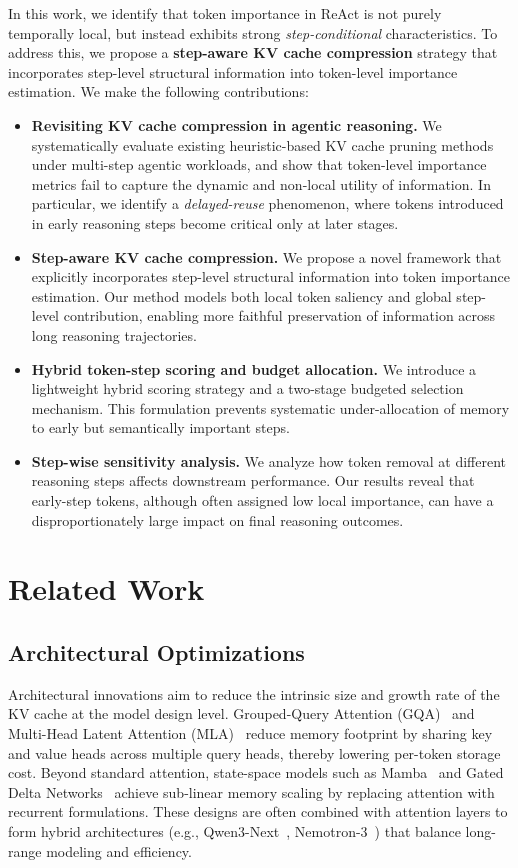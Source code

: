 \documentclass[11pt]{article}
\begin{document}
In this work, we identify that token importance in ReAct is not purely temporally local, but instead exhibits strong \emph{step-conditional} characteristics. To address this, we propose a \textbf{step-aware KV cache compression} strategy that incorporates step-level structural information into token-level importance estimation. We make the following contributions:
\begin{itemize}
    \item \textbf{Revisiting KV cache compression in agentic reasoning.} We systematically evaluate existing heuristic-based KV cache pruning methods under multi-step agentic workloads, and show that token-level importance metrics fail to capture the dynamic and non-local utility of information. In particular, we identify a \emph{delayed-reuse} phenomenon, where tokens introduced in early reasoning steps become critical only at later stages.
    \item \textbf{Step-aware KV cache compression.} We propose a novel framework that explicitly incorporates step-level structural information into token importance estimation. Our method models both local token saliency and global step-level contribution, enabling more faithful preservation of information across long reasoning trajectories.
    \item \textbf{Hybrid token-step scoring and budget allocation.} We introduce a lightweight hybrid scoring strategy and a two-stage budgeted selection mechanism. This formulation prevents systematic under-allocation of memory to early but semantically important steps.
    \item \textbf{Step-wise sensitivity analysis.} We analyze how token removal at different reasoning steps affects downstream performance. Our results reveal that early-step tokens, although often assigned low local importance, can have a disproportionately large impact on final reasoning outcomes.
\end{itemize}

\section{Related Work}

\subsection{Architectural Optimizations}

Architectural innovations aim to reduce the intrinsic size and growth rate of the KV cache at the model design level. Grouped-Query Attention (GQA)~\cite{gqa} and Multi-Head Latent Attention (MLA)~\cite{mla} reduce memory footprint by sharing key and value heads across multiple query heads, thereby lowering per-token storage cost. Beyond standard attention, state-space models such as Mamba~\cite{gu2023mamba} and Gated Delta Networks~\cite{yang2024gateddelta} achieve sub-linear memory scaling by replacing attention with recurrent formulations. These designs are often combined with attention layers to form hybrid architectures (e.g., Qwen3-Next~\cite{qwen2025next}, Nemotron-3~\cite{nvidia2025nemotron}) that balance long-range modeling and efficiency.
\end{document}
